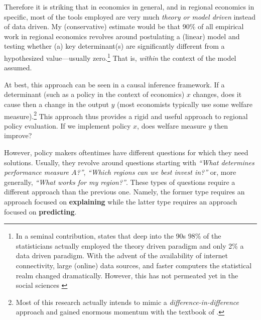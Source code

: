 \documentclass[fleqn,10pt]{SelfArx} %
\begin{document}
Therefore it is striking that in economics in general, and in regional economics
in specific, most of the tools employed are very much \textit{theory or model
  driven} instead of data driven. My (conservative) estimate would be that 90\%
of all empirical work in regional economics revolves around postulating a
(linear) model and testing whether (a) key determinant(s) are significantly
different from a hypothesized value---usually zero.\footnote{In a seminal
  contribution, \cite{breiman2001statistical} states that deep into the 90s 98\%
  of the statisticians actually employed the theory driven paradigm and only 2\%
  a data driven paradigm. With the advent of the availability of internet
  connectivity, large (online) data sources, and faster computers the
  statistical realm changed dramatically. However, this has not permeated yet in
  the social sciences \citep[see as well][]{varian2014big}} That is, \textit{within} the context of the model assumed.

At best, this approach can be seen in a causal inference framework. If a
determinant (such as a policy in the context of economics) $x$ changes, does it
cause then a change in the output $y$ (most economists typically use some welfare measure).\footnote{Most of this research actually intends to mimic a \textit{difference-in-difference} approach and gained enormous momentum with the textbook of \citet{angrist2008mostly}.} This approach thus provides a rigid and useful approach to regional policy evaluation. If we implement policy $x$, does welfare measure $y$ then improve? 

However, policy makers oftentimes have different questions for which they need
solutions. Usually, they revolve around questions starting with \textit{``What
  determines performance measure $A$?''}, \textit{``Which regions can we best
    invest in?''} or, more generally, \textit{``What
  works for my region?''}. These types of questions require a different approach
than the previous one. Namely, the former type requires an approach focused on \textbf{explaining} while the latter type requires an approach focused on \textbf{predicting}.
\end{document}
